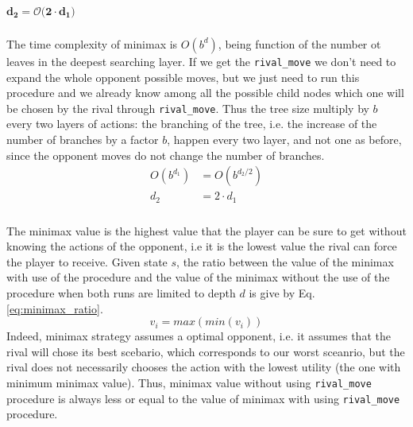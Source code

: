 \textbf{$\boldsymbol{d_{2}=\mathcal{O}(2\cdot d_{1}})$ }

\subsubsection{}
The time complexity of minimax is $O(b^{d})$, being function of the number ot leaves in the deepest searching layer. If we get the \lstinline!rival_move! we don't need to expand the whole opponent possible moves, but we just need to run this procedure and we already know among all the possible child nodes which one will be chosen by the rival through \lstinline!rival_move!. Thus the tree size multiply by $b$ every two layers of actions: the branching of the tree, i.e. the increase of the number of branches by a factor $b$, happen every two layer, and not one as before, since the opponent moves do not change the number of branches.
\begin{align*}
    O(b^{d_{1}}) &= O(b^{d_{2}/2}) \\
    d_{2} &= 2\cdot d_{1}
\end{align*}

\subsubsection{}
The minimax value is the highest value that the player can be sure to get without knowing the actions of the opponent, i.e it is the lowest value the rival can force the player to receive. Given state $s$, the ratio between the value of the minimax with use of the procedure and the value of the minimax without the use of the procedure when both runs are limited to depth $d$ is give by Eq. \ref{eq:minimax_ratio}.
\begin{equation}\label{eq:minimax_ratio}
    v_{i}=max(min(v_{i}))
\end{equation}
Indeed, minimax strategy assumes a optimal opponent, i.e. it assumes that the rival will chose its best scebario, which corresponds to our worst sceanrio, but the rival does not necessarily chooses the action with the lowest utility (the one with minimum minimax value). Thus, minimax value without using \lstinline!rival_move! procedure is always less or equal to the value of minimax with using \lstinline!rival_move! procedure.
